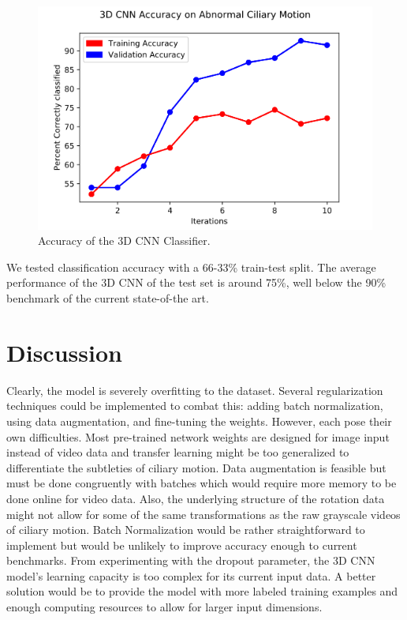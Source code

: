 \begin{figure}[H]
\includegraphics[scale=0.5]{CNN_graph}
\caption{Accuracy of the 3D CNN Classifier.}

\end{figure}

We tested classification accuracy with a 66-33\% train-test split. The average performance of the 3D CNN of the test set is around 75\%, well below the 90\% benchmark of the current state-of-the art. 

\section{Discussion}

Clearly, the model is severely overfitting to the dataset. Several regularization techniques could be implemented to combat this: adding batch normalization, using data augmentation, and fine-tuning the weights. However, each pose their own difficulties. Most pre-trained network weights are designed for image input instead of video data and transfer learning \cite{pan2010survey} might be too generalized to differentiate the subtleties of ciliary motion. Data augmentation is feasible but must be done congruently with batches which would require more memory to be done online for video data. Also, the underlying structure of the rotation data might not allow for some of the same transformations as the raw grayscale videos of ciliary motion. Batch Normalization \cite{ioffe2015batch} would be rather straightforward to implement but would be unlikely to improve accuracy enough to current benchmarks. From experimenting with the dropout parameter, the 3D CNN model's learning capacity is too complex for its current input data. A better solution would be to provide the model with more labeled training examples and enough computing resources to allow for larger input dimensions. 
 
